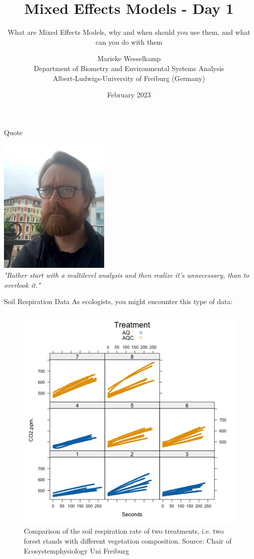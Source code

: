 \documentclass{beamer}
\title{Mixed Effects Models - Day 1}
\subtitle{What are Mixed Effects Models, why and when should you use them, and what can you do with them}
\author{Marieke Wesselkamp \\ Department of Biometry and Environmental Systems Analysis \\ Albert-Ludwigs-University of Freiburg (Germany)}
\date{February 2023}
\begin{document}
\begin{frame}
  \titlepage
\end{frame}

\begin{frame}{Quote}
  \begin{center}
    \includegraphics[width=0.4\textwidth]{lectures/day_1_intro_to_mems/figures/mcelreath2020.jpg}
    \\
    \bigskip
    \textit{"Rather start with a multilevel analysis and then realize it's unnecessary, than to overlook it."}
  \end{center}
\end{frame}

\begin{frame}{Soil Respiration Data}
  As ecologists, you might encounter this type of data:

\begin{figure}
    \centering
    \includegraphics[width=0.5\linewidth]{lectures/day_1_intro_to_mems/figures/plot_1.png}
    \caption{Comparison of the soil respiration rate of two treatments, i.e. two forest stands with different vegetation composition. Source: Chair of Ecosystemphysiology Uni Freiburg}
\end{figure}

\end{frame}
\end{document}
